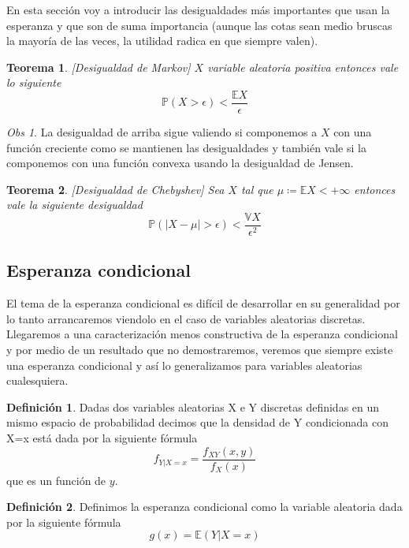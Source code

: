 \documentclass[11pt]{article}
\theoremstyle{plain} %
\newtheorem{teorema}{\color{rojo}Teorema}
\theoremstyle{definition}
\newtheorem*{definicion}{Definici\'{o}n} %
\theoremstyle{remark}
\newtheorem{obs}{Obs}
\def\V{\mathbb{V}}
\def\E{\mathbb{E}}
\def\P{\mathbb{P}}
\def\va{variable aleatoria }
\def\vas{variables aleatorias }
\def\blue{\textcolor{blue!60!black}}
\begin{document}
En esta sección voy a introducir las desigualdades más importantes que usan la esperanza y que son de suma importancia (aunque las cotas sean medio bruscas la mayoría de las veces, la utilidad radica en que siempre valen).

\begin{teorema}	
	\label{teo:markov}
	[Desigualdad de Markov]
	$X$ \va positiva entonces vale lo siguiente
	\[ \P\left( X>\epsilon\right)  < \dfrac{\E X}{\epsilon} \]
\end{teorema}


\begin{obs}	
	La desigualdad de arriba sigue valiendo si componemos a $X$ con una función creciente como se mantienen las desigualdades y también vale si la componemos con una función convexa usando la desigualdad de Jensen.
\end{obs}

\begin{teorema}
	\label{teo:cheby}
	[Desigualdad de  Chebyshev]
	Sea $X$ tal que $\mu \coloneqq \E X < +\infty$ entonces vale la siguiente desigualdad
	\[ \P\left( \left| X - \mu \right| > \epsilon \right) < \dfrac{\V X}{\epsilon ^ {2}} \]
\end{teorema}




\subsection{Esperanza condicional}
El tema de la esperanza condicional es difícil de desarrollar en su generalidad por lo tanto arrancaremos viendolo en el caso de \vas discretas. Llegaremos a una caracterización menos constructiva de la esperanza condicional y por medio de un resultado que no demostraremos, veremos que siempre existe una esperanza condicional y así lo generalizamos para \vas cualesquiera.

\begin{definicion}
	Dadas dos variables aleatorias X e Y discretas definidas en un mismo espacio de probabilidad decimos que la \blue{densidad de Y condicionada con X=x} está dada por la siguiente fórmula
	\[ f_{Y|X=x} = \dfrac{f_{XY} (x,y)}{f_X(x)} \]
	que es un función de $y$.
\end{definicion}

\begin{definicion}
	Definimos la \blue{esperanza condicional} como la \va dada por la siguiente fórmula
	\[ g(x) = \E (Y|X=x) \]
\end{definicion}
\end{document}
